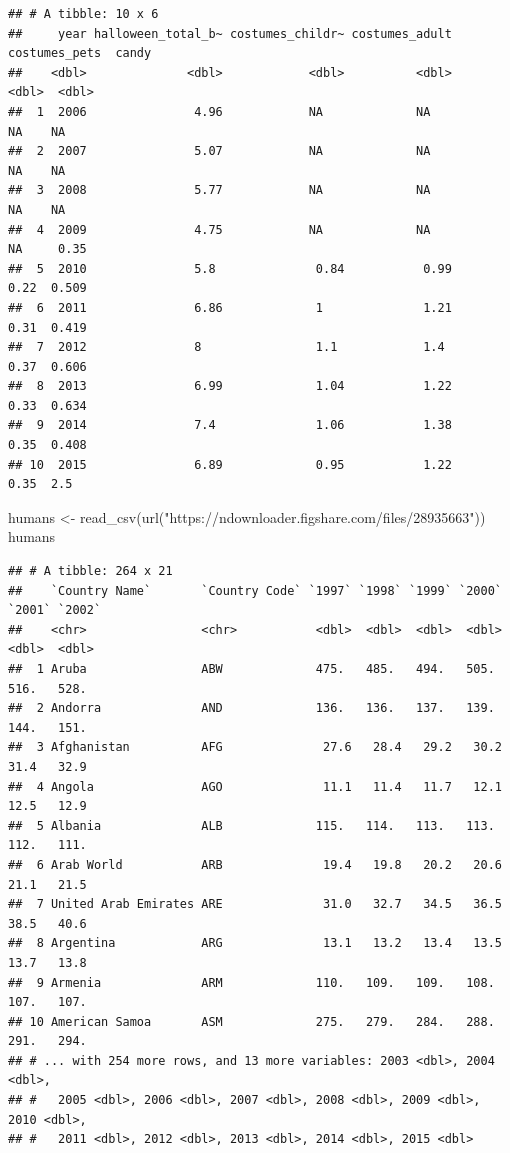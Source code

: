\documentclass[
]{book}
\newenvironment{Shaded}{\begin{snugshade}}{\end{snugshade}}
\newcommand{\FunctionTok}[1]{\textcolor[rgb]{0.00,0.00,0.00}{#1}}
\newcommand{\NormalTok}[1]{#1}
\newcommand{\OtherTok}[1]{\textcolor[rgb]{0.56,0.35,0.01}{#1}}
\newcommand{\StringTok}[1]{\textcolor[rgb]{0.31,0.60,0.02}{#1}}
\begin{document}
\begin{verbatim}
## # A tibble: 10 x 6
##     year halloween_total_b~ costumes_childr~ costumes_adult costumes_pets  candy
##    <dbl>              <dbl>            <dbl>          <dbl>         <dbl>  <dbl>
##  1  2006               4.96            NA             NA            NA    NA    
##  2  2007               5.07            NA             NA            NA    NA    
##  3  2008               5.77            NA             NA            NA    NA    
##  4  2009               4.75            NA             NA            NA     0.35 
##  5  2010               5.8              0.84           0.99          0.22  0.509
##  6  2011               6.86             1              1.21          0.31  0.419
##  7  2012               8                1.1            1.4           0.37  0.606
##  8  2013               6.99             1.04           1.22          0.33  0.634
##  9  2014               7.4              1.06           1.38          0.35  0.408
## 10  2015               6.89             0.95           1.22          0.35  2.5
\end{verbatim}

\begin{Shaded}
\begin{Highlighting}[]
\NormalTok{humans }\OtherTok{\textless{}{-}} \FunctionTok{read\_csv}\NormalTok{(}\FunctionTok{url}\NormalTok{(}\StringTok{"https://ndownloader.figshare.com/files/28935663"}\NormalTok{))}
\NormalTok{humans}
\end{Highlighting}
\end{Shaded}

\begin{verbatim}
## # A tibble: 264 x 21
##    `Country Name`       `Country Code` `1997` `1998` `1999` `2000` `2001` `2002`
##    <chr>                <chr>           <dbl>  <dbl>  <dbl>  <dbl>  <dbl>  <dbl>
##  1 Aruba                ABW             475.   485.   494.   505.   516.   528. 
##  2 Andorra              AND             136.   136.   137.   139.   144.   151. 
##  3 Afghanistan          AFG              27.6   28.4   29.2   30.2   31.4   32.9
##  4 Angola               AGO              11.1   11.4   11.7   12.1   12.5   12.9
##  5 Albania              ALB             115.   114.   113.   113.   112.   111. 
##  6 Arab World           ARB              19.4   19.8   20.2   20.6   21.1   21.5
##  7 United Arab Emirates ARE              31.0   32.7   34.5   36.5   38.5   40.6
##  8 Argentina            ARG              13.1   13.2   13.4   13.5   13.7   13.8
##  9 Armenia              ARM             110.   109.   109.   108.   107.   107. 
## 10 American Samoa       ASM             275.   279.   284.   288.   291.   294. 
## # ... with 254 more rows, and 13 more variables: 2003 <dbl>, 2004 <dbl>,
## #   2005 <dbl>, 2006 <dbl>, 2007 <dbl>, 2008 <dbl>, 2009 <dbl>, 2010 <dbl>,
## #   2011 <dbl>, 2012 <dbl>, 2013 <dbl>, 2014 <dbl>, 2015 <dbl>
\end{verbatim}
\end{document}
